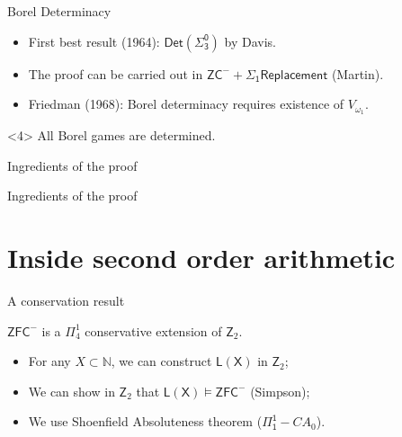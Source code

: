 \documentclass{beamer} %
\begin{document}

\begin{frame}{Borel Determinacy}
    \begin{itemize}
        \item<1-> First best result (1964): $\mathsf{Det(\Sigma^0_3)}$ by Davis.
        \item<2-> The proof can be carried out in $\mathsf{ZC^- + \Sigma_1 Replacement}$ (Martin).
        \item<3-> Friedman (1968): Borel determinacy requires existence of $V_{\omega_1}$. 
    \end{itemize}

    \begin{theorem}<4>
        All Borel games are determined.
    \end{theorem}

\end{frame}


\begin{frame}{Ingredients of the proof}

\end{frame}


\begin{frame}{Ingredients of the proof}
    
\end{frame}


\section{Inside second order arithmetic}

\begin{frame}{A conservation result}
    \begin{theorem}
        $\mathsf{ZFC}^-$ is a $\Pi^1_4$ conservative extension of $\mathsf{Z}_2$.    
    \end{theorem}
    
    \begin{itemize}
        \item<2-> For any $X \subset \mathbb{N}$, we can construct $\mathsf{L(X)}$ in $\mathsf{Z}_2$;
        \item<3-> We can show in $\mathsf{Z}_2$ that $\mathsf{L(X)} \models \mathsf{ZFC}^-$ (Simpson);
        \item<4-> We use Shoenfield Absoluteness theorem ($\mathsf{\Pi_1^1}-CA_0$).
    \end{itemize}

\end{frame}
\end{document}

